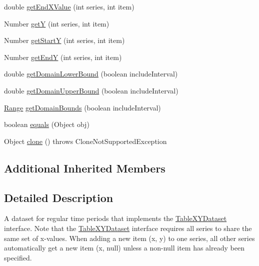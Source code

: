 \begin{DoxyCompactItemize}
double \mbox{\hyperlink{classorg_1_1jfree_1_1data_1_1time_1_1_time_table_x_y_dataset_a436f721f4b20c9209b8fdc9b3e947e62}{get\+End\+X\+Value}} (int series, int item)
\item 
Number \mbox{\hyperlink{classorg_1_1jfree_1_1data_1_1time_1_1_time_table_x_y_dataset_a774346f32546e4722886bf5b837d6d7a}{getY}} (int series, int item)
\item 
Number \mbox{\hyperlink{classorg_1_1jfree_1_1data_1_1time_1_1_time_table_x_y_dataset_a7ca009f40f1b341c4a1bf7da9ef461de}{get\+StartY}} (int series, int item)
\item 
Number \mbox{\hyperlink{classorg_1_1jfree_1_1data_1_1time_1_1_time_table_x_y_dataset_aa5852bdf77d8d13d5b5a0ef5c8e138e7}{get\+EndY}} (int series, int item)
\item 
double \mbox{\hyperlink{classorg_1_1jfree_1_1data_1_1time_1_1_time_table_x_y_dataset_a81f1ebe8487533e070d335efa8974bf8}{get\+Domain\+Lower\+Bound}} (boolean include\+Interval)
\item 
double \mbox{\hyperlink{classorg_1_1jfree_1_1data_1_1time_1_1_time_table_x_y_dataset_ae597f42b0c5c2b5b9b7515e1af48c5ba}{get\+Domain\+Upper\+Bound}} (boolean include\+Interval)
\item 
\mbox{\hyperlink{classorg_1_1jfree_1_1data_1_1_range}{Range}} \mbox{\hyperlink{classorg_1_1jfree_1_1data_1_1time_1_1_time_table_x_y_dataset_ac8ffe14dbf4e3a9934c19222d97acbfe}{get\+Domain\+Bounds}} (boolean include\+Interval)
\item 
boolean \mbox{\hyperlink{classorg_1_1jfree_1_1data_1_1time_1_1_time_table_x_y_dataset_aff3bb17c934999eeeb756e0c862a6f36}{equals}} (Object obj)
\item 
Object \mbox{\hyperlink{classorg_1_1jfree_1_1data_1_1time_1_1_time_table_x_y_dataset_a1b3985de255225270a8dd58319319d9f}{clone}} ()  throws Clone\+Not\+Supported\+Exception 
\end{DoxyCompactItemize}
\subsection*{Additional Inherited Members}


\subsection{Detailed Description}
A dataset for regular time periods that implements the \mbox{\hyperlink{}{Table\+X\+Y\+Dataset}} interface. Note that the \mbox{\hyperlink{}{Table\+X\+Y\+Dataset}} interface requires all series to share the same set of x-\/values. When adding a new item {\ttfamily (x, y)} to one series, all other series automatically get a new item {\ttfamily (x, null)} unless a non-\/null item has already been specified.

